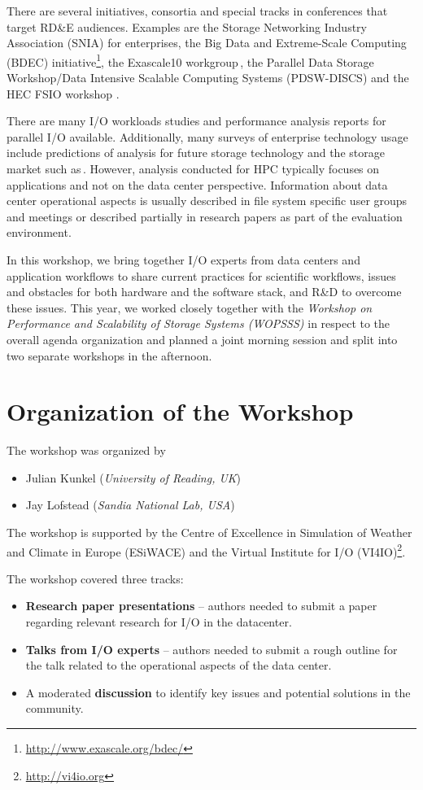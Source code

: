 \documentclass{llncs}
\begin{document}
There are several initiatives, consortia and special tracks in conferences that target RD\&E audiences.
Examples are the Storage Networking Industry Association (SNIA) for enterprises, the
Big Data and Extreme-Scale Computing (BDEC) initiative\footnote{\url{http://www.exascale.org/bdec/}}, the
Exascale10 workgroup\,\cite{brinkmann14}, the Parallel Data Storage Workshop/Data Intensive Scalable Computing Systems
(PDSW-DISCS) and the HEC FSIO workshop \cite{bancroft2009}.

There are many I/O workloads studies and performance analysis reports for parallel I/O available.
Additionally, many surveys of enterprise technology usage include predictions of analysis for future storage technology and the storage market such as\,\cite{idc1}.
However, analysis conducted for HPC typically focuses on applications and not on the data center perspective.
Information about data center operational aspects is usually described in file system specific user groups and meetings or described partially in research papers as part of the evaluation environment.

In this workshop, we bring together I/O experts from data centers and application workflows to share current practices for scientific workflows, issues and obstacles for both hardware and the software stack, and R\&D to overcome these issues.
This year, we worked closely together with the \textit{Workshop on Performance and Scalability of Storage Systems (WOPSSS)} in respect to the overall agenda organization and planned a joint morning session and split into two separate workshops in the afternoon.


\section{Organization of the Workshop}

The workshop was organized by

\begin{itemize}
	\item Julian Kunkel (\textit{University of Reading, UK})
	\item Jay Lofstead (\textit{Sandia National Lab, USA})
\end{itemize}

\noindent The workshop is supported by the Centre of Excellence in Simulation of Weather and Climate in Europe (ESiWACE) and the Virtual Institute for I/O (VI4IO)\footnote{\url{http://vi4io.org}}.

\noindent The workshop covered three tracks:
\begin{itemize}
  \item \textbf{Research paper presentations} -- authors needed to submit a paper regarding relevant research for I/O in the datacenter.
  \item \textbf{Talks from I/O experts} -- authors needed to submit a rough outline for the talk related to the operational aspects of the data center.
  \item A moderated \textbf{discussion} to identify key issues and potential solutions in the community.
\end{itemize}
\end{document}
